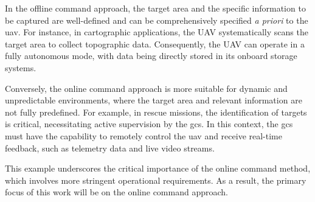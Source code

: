 In the offline command approach, the target area and the specific information to
be captured are well-defined and can be comprehensively specified \emph{a
priori} to the \gls{uav}. For instance, in cartographic applications, the UAV
systematically scans the target area to collect topographic data. Consequently,
the UAV can operate in a fully autonomous mode, with data being directly stored
in its onboard storage systems.

Conversely, the online command approach is more suitable for dynamic and
unpredictable environments, where the target area and relevant information are
not fully predefined. For example, in rescue missions, the identification of
targets is critical, necessitating active supervision by the \gls{gcs}. In this
context, the \gls{gcs} must have the capability to remotely control the \gls{uav} and receive real-time feedback, such as telemetry data and live video streams.

This example underscores the critical importance of the online command method,
which involves more stringent operational requirements. As a result, the primary
focus of this work will be on the online command approach.





